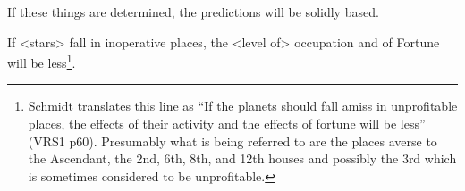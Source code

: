If these things are determined, the predictions will be solidly based. 

If <stars> fall in inoperative places, the <level of> occupation and of Fortune will be less\footnote{Schmidt translates this line as ``If the planets should fall amiss in unprofitable places, the effects of their activity and the effects of fortune will be less'' (VRS1 p60). Presumably what is being referred to are the places averse to the Ascendant, the 2nd, 6th, 8th, and 12th houses and possibly the 3rd which is sometimes considered to be unprofitable.}.

\newpage